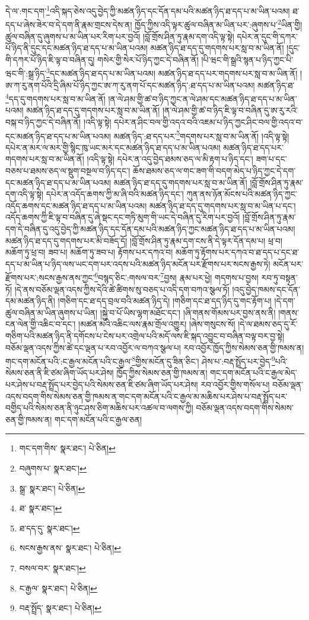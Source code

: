 དེ་ལ་:གང་དག་\footnote{གང་དག་གིས་  སྣར་ཐང་།  པེ་ཅིན། }འདི་སྐད་ཅེས་འདུ་བྱེད་ཀྱི་མཚན་ཉིད་དང་དོན་དམ་པའི་མཚན་ཉིད་ཐ་དད་པ་མ་ཡིན་པའམ། ཐ་དད་པ་ཞེས་ཟེར་བ་དེ་དག་ནི་རྣམ་གྲངས་དེས་ན། ཁྱོད་ཀྱིས་འདི་ལྟར་ཚུལ་བཞིན་མ་ཡིན་པར་:ཞུགས་པ་\footnote{བཞུགས་པ་  སྣར་ཐང་། }ཡིན་གྱི། ཚུལ་བཞིན་དུ་ཞུགས་པ་མ་ཡིན་པར་རིག་པར་བྱའོ། །བློ་གྲོས་ཤིན་ཏུ་རྣམ་དག་འདི་ལྟ་སྟེ། དཔེར་ན་དུང་གི་དཀར་པོ་ཉིད་ནི་དུང་དང་མཚན་ཉིད་ཐ་དད་པ་མ་ཡིན་པའམ། མཚན་ཉིད་ཐ་དད་དུ་གདགས་པར་སླ་བ་མ་ཡིན་ནོ། །དུང་གི་དཀར་པོ་ཉིད་ཇི་ལྟ་བ་བཞིན་དུ། གསེར་གྱི་སེར་པོ་ཉིད་ཀྱང་དེ་བཞིན་ནོ། །པི་ཝང་གི་སྒྲའི་སྙན་པ་ཉིད་ཀྱང་པི་ཝང་གི་:སྒྲ་ཉིད་\footnote{སྒྲ་  སྣར་ཐང་།  པེ་ཅིན། }དང་མཚན་ཉིད་ཐ་དད་པ་མ་ཡིན་པའམ། མཚན་ཉིད་ཐ་དད་པར་གདགས་པར་སླ་བ་མ་ཡིན་ནོ། །ཨ་ཀ་རུ་ནག་པོའི་དྲི་ཞིམ་པོ་ཉིད་ཀྱང་ཨ་ཀ་རུ་ནག་པོ་དང་མཚན་ཉིད་:ཐ་དད་པ་མ་ཡིན་པའམ། མཚན་ཉིད་ཐ་\footnote{ཐ་  སྣར་ཐང་། }དད་དུ་གདགས་པར་སླ་བ་མ་ཡིན་ནོ། །ན་ལེ་ཤམ་གྱི་ཚ་བ་ཉིད་ཀྱང་ན་ལེ་ཤམ་དང་མཚན་ཉིད་ཐ་དད་པ་མ་ཡིན་པའམ། མཚན་ཉིད་ཐ་དད་དུ་གདགས་པར་སླ་བ་མ་ཡིན་ནོ། །ན་ལེ་ཤམ་གྱི་ཚ་བ་ཉིད་ཇི་ལྟ་བ་བཞིན་དུ་ཨ་རུ་རའི་བསྐ་བ་ཉིད་ཀྱང་དེ་བཞིན་ནོ། །འདི་ལྟ་སྟེ། དཔེར་ན་ཤིང་བལ་གྱི་འདའ་བའི་འཇམ་པ་ཉིད་ཀྱང་ཤིང་བལ་གྱི་འདའ་བ་དང་མཚན་ཉིད་ཐ་དད་པ་མ་ཡིན་པའམ། མཚན་ཉིད་:ཐ་དད་པར་\footnote{ཐ་དད་དུ་  སྣར་ཐང་། }གདགས་པར་སླ་བ་མ་ཡིན་ནོ། །འདི་ལྟ་སྟེ། དཔེར་ན་མར་ལ་མར་གྱི་སྙིང་ཁུ་ཡང་མར་དང་མཚན་ཉིད་ཐ་དད་པ་མ་ཡིན་པའམ། མཚན་ཉིད་ཐ་དད་པར་གདགས་པར་སླ་བ་མ་ཡིན་ནོ། །འདི་ལྟ་སྟེ། དཔེར་ན་འདུ་བྱེད་ཐམས་ཅད་ལ་མི་རྟག་པ་ཉིད་དང་། ཟག་པ་དང་བཅས་པ་ཐམས་ཅད་ལ་སྡུག་བསྔལ་བ་ཉིད་དང་། ཆོས་ཐམས་ཅད་ལ་གང་ཟག་གི་བདག་མེད་པ་ཉིད་ཀྱང་དེ་དག་དང་མཚན་ཉིད་ཐ་དད་པ་མ་ཡིན་པའམ། མཚན་ཉིད་ཐ་དད་དུ་གདགས་པར་སླ་བ་མ་ཡིན་ནོ། །བློ་གྲོས་ཤིན་ཏུ་རྣམ་དག་འདི་ལྟ་སྟེ། དཔེར་ན་འདོད་ཆགས་ཀྱི་མ་ཞི་བའི་མཚན་ཉིད་དང་། ཀུན་ནས་ཉོན་མོངས་པའི་མཚན་ཉིད་ཀྱང་འདོད་ཆགས་དང་མཚན་ཉིད་ཐ་དད་པ་མ་ཡིན་པའམ། མཚན་ཉིད་ཐ་དད་དུ་གདགས་པར་སླ་བ་མ་ཡིན་པ་དང་། འདོད་ཆགས་ཀྱི་ཇི་ལྟ་བ་བཞིན་དུ་ཞེ་སྡང་དང་གཏི་མུག་གི་ཡང་དེ་བཞིན་དུ་རིག་པར་བྱའོ། །བློ་གྲོས་ཤིན་ཏུ་རྣམ་དག་དེ་བཞིན་དུ་འདུ་བྱེད་ཀྱི་མཚན་ཉིད་དང་དོན་དམ་པའི་མཚན་ཉིད་ཀྱང་མཚན་ཉིད་ཐ་དད་པ་མ་ཡིན་པའམ། མཚན་ཉིད་ཐ་དད་དུ་གདགས་པར་མི་བཟོད་དོ། །བློ་གྲོས་ཤིན་ཏུ་རྣམ་དག་ངས་ནི་དེ་ལྟར་དོན་དམ་པ། ཕྲ་བ། མཆོག་ཏུ་ཕྲ་བ། ཟབ་པ། མཆོག་ཏུ་ཟབ་པ། རྟོགས་པར་དཀའ་བ། མཆོག་ཏུ་རྟོགས་པར་དཀའ་བ་ཐ་དད་པ་དང་ཐ་དད་པ་མ་ཡིན་པ་ཉིད་ལས་ཡང་དག་པར་འདས་པའི་མཚན་ཉིད་མངོན་པར་རྫོགས་པར་སངས་རྒྱས་ཏེ། མངོན་པར་རྫོགས་པར་:སངས་རྒྱས་ནས་ཀྱང་\footnote{སངས་རྒྱས་ནས་  སྣར་ཐང་།  པེ་ཅིན། }བསྙད་ཅིང་:གསལ་བར་\footnote{བསལ་བར་  སྣར་ཐང་། }བྱས། རྣམ་པར་ཕྱེ། གདགས་པ་བྱས། རབ་ཏུ་བསྟན་ཏོ། །དེ་ནས་བཅོམ་ལྡན་འདས་ཀྱིས་དེའི་ཚེ་ཚིགས་སུ་བཅད་པ་འདི་དག་བཀའ་སྩལ་ཏོ། །འདུ་བྱེད་ཁམས་དང་དོན་དམ་མཚན་ཉིད་ནི། །གཅིག་དང་ཐ་དད་བྲལ་བའི་མཚན་ཉིད་དེ། །གཅིག་དང་ཐ་དད་ཉིད་དུ་གང་རྟོག་པ། །དེ་དག་ཚུལ་བཞིན་མ་ཡིན་ཞུགས་པ་ཡིན། །སྐྱེ་བ་པོ་ཡིས་ལྷག་མཐོང་དང་། །ཞི་གནས་གོམས་པར་བྱས་ནས་ནི། །གནས་ངན་ལེན་གྱི་འཆིང་བ་དང་། །མཚན་མའི་འཆིང་ལས་རྣམ་གྲོལ་འགྱུར། །ཞེས་གསུངས་སོ། །དེ་ལ་ཐམས་ཅད་དུ་རོ་གཅིག་པའི་མཚན་ཉིད་ནི་དགོངས་པ་ངེས་པར་འགྲེལ་པའི་མདོ་ལས་ཇི་སྐད་འབྱུང་བ་བཞིན་བལྟ་བར་བྱ་སྟེ། བཅོམ་ལྡན་འདས་ཀྱིས་ཚེ་དང་ལྡན་པ་རབ་འབྱོར་ལ་བཀའ་སྩལ་པ། རབ་འབྱོར་ཁྱོད་ཀྱིས་སེམས་ཅན་གྱི་ཁམས་ན། གང་དག་མངོན་པའི་:ང་རྒྱལ་མངོན་པའི་ང་རྒྱལ་\footnote{ང་རྒྱལ་  སྣར་ཐང་།  པེ་ཅིན། }གྱིས་མངོན་དུ་ཟིན་ཅིང་། ཤེས་པ་:བརྡ་སྤྲོད་པར་བྱེད་\footnote{བརྡ་སྤྲོད་  སྣར་ཐང་།  པེ་ཅིན། }པའི་སེམས་ཅན་ནི་ཇི་ཙམ་ཞིག་ཡོད་པར་ཤེས། ཁྱོད་ཀྱིས་སེམས་ཅན་གྱི་ཁམས་ན། གང་དག་མངོན་པའི་ང་རྒྱལ་མེད་པར་ཤེས་པ་བརྡ་སྤྲོད་པར་བྱེད་པའི་སེམས་ཅན་ཇི་ཙམ་ཞིག་ཡོད་པར་ཤེས། རབ་འབྱོར་གྱིས་གསོལ་པ། བཅོམ་ལྡན་འདས་བདག་གིས་སེམས་ཅན་གྱི་ཁམས་ན་གང་དག་མངོན་པའི་ང་རྒྱལ་མ་མཆིས་པར་ཤེས་པ་བརྡ་སྤྲོད་པར་བགྱིད་པའི་སེམས་ཅན་ནི་ཉུང་ཤས་ཅིག་མཆིས་པར་འཚལ་བ་ལགས་ཀྱི། བཅོམ་ལྡན་འདས་བདག་གིས་སེམས་ཅན་གྱི་ཁམས་ན། གང་དག་མངོན་པའི་ང་རྒྱལ་ཅན། 